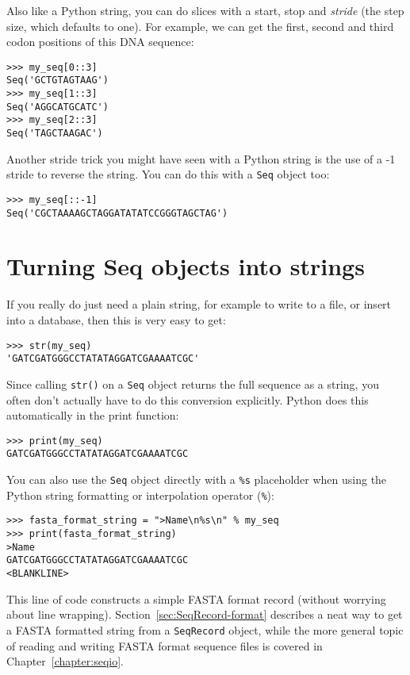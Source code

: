 Also like a Python string, you can do slices with a start, stop and \emph{stride} (the step size, which defaults to one).  For example, we can get the first, second and third codon positions of this DNA sequence:

\begin{verbatim}
>>> my_seq[0::3]
Seq('GCTGTAGTAAG')
>>> my_seq[1::3]
Seq('AGGCATGCATC')
>>> my_seq[2::3]
Seq('TAGCTAAGAC')
\end{verbatim}

Another stride trick you might have seen with a Python string is the use of a -1 stride to reverse the string.  You can do this with a \verb|Seq| object too:

\begin{verbatim}
>>> my_seq[::-1]
Seq('CGCTAAAAGCTAGGATATATCCGGGTAGCTAG')
\end{verbatim}

\section{Turning Seq objects into strings}
\label{sec:seq-to-string}

If you really do just need a plain string, for example to write to a file, or insert into a database, then this is very easy to get:

\begin{verbatim}
>>> str(my_seq)
'GATCGATGGGCCTATATAGGATCGAAAATCGC'
\end{verbatim}

Since calling \verb|str()| on a \verb|Seq| object returns the full sequence as a string,
you often don't actually have to do this conversion explicitly.
Python does this automatically in the print function:

\begin{verbatim}
>>> print(my_seq)
GATCGATGGGCCTATATAGGATCGAAAATCGC
\end{verbatim}

You can also use the \verb|Seq| object directly with a \verb|%s| placeholder when using the Python string formatting or interpolation operator (\verb|%|):

\begin{verbatim}
>>> fasta_format_string = ">Name\n%s\n" % my_seq
>>> print(fasta_format_string)
>Name
GATCGATGGGCCTATATAGGATCGAAAATCGC
<BLANKLINE>
\end{verbatim}

\noindent This line of code constructs a simple FASTA format record (without worrying about line wrapping).
Section~\ref{sec:SeqRecord-format} describes a neat way to get a FASTA formatted
string from a \verb|SeqRecord| object, while the more general topic of reading and
writing FASTA format sequence files is covered in Chapter~\ref{chapter:seqio}.

